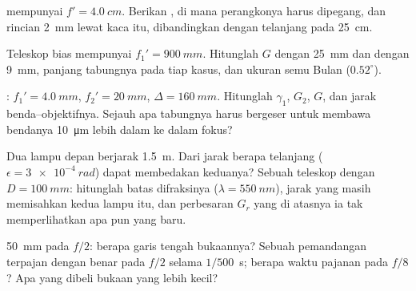 \begin{exercise}[$\star$]\label{exo:b1:optical-instruments:3}
 mempunyai $f' = \qty{4.0}{cm}$. Berikan , di mana perangkonya harus dipegang, dan  rincian
\qty{2}{mm} lewat kaca itu, dibandingkan dengan  telanjang pada \qty{25}{cm}.
\end{exercise}

\begin{exercise}[$\star$]\label{exo:b1:optical-instruments:4}
Teleskop bias mempunyai $f_1' = \qty{900}{mm}$. Hitunglah $G$ dengan
 \qty{25}{mm} dan dengan  \qty{9}{mm}, panjang tabungnya
pada tiap kasus, dan ukuran semu Bulan ($0.52^\circ$).
\end{exercise}

\begin{exercise}[$\star\star$]\label{exo:b1:optical-instruments:5}
: $f_1' = \qty{4.0}{mm}$, $f_2' = \qty{20}{mm}$,
$\Delta = \qty{160}{mm}$. Hitunglah $\gamma_1$, $G_2$, $G$, dan jarak
benda--objektifnya. Sejauh apa tabungnya harus bergeser untuk membawa
bendanya \qty{10}{\micro m} lebih dalam ke dalam fokus?
\end{exercise}

\begin{exercise}[$\star\star$]\label{exo:b1:optical-instruments:6}
Dua lampu depan berjarak \qty{1.5}{m}. Dari jarak berapa  telanjang
($\epsilon = \qty{3e-4}{rad}$) dapat membedakan keduanya? Sebuah
teleskop dengan $D = \qty{100}{mm}$: hitunglah batas difraksinya ($\lambda =
\qty{550}{nm}$), jarak yang masih memisahkan kedua lampu itu, dan
perbesaran $G_r$ yang di atasnya ia tak memperlihatkan apa pun yang baru.
\end{exercise}

\begin{exercise}[$\star\star$]\label{exo:b1:optical-instruments:7}
 \qty{50}{mm} pada $f/2$: berapa garis tengah bukaannya? Sebuah
pemandangan terpajan dengan benar pada $f/2$ selama $1/500$~\unit{s};
berapa waktu pajanan pada $f/8$? Apa yang dibeli bukaan yang lebih kecil?
\end{exercise}

